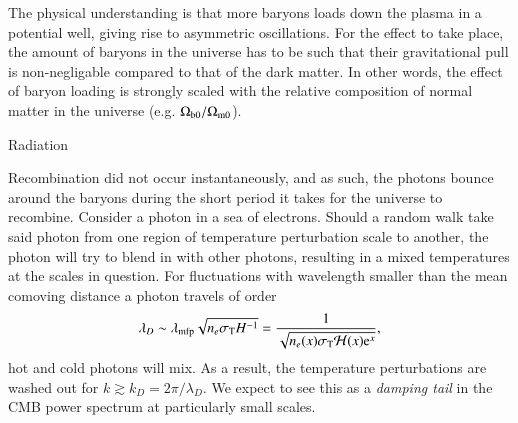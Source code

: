     The physical understanding is that more baryons loads down the plasma in a potential well, giving rise to asymmetric oscillations. For the effect to take place, the amount of baryons in the universe has to be such that their gravitational pull is non-negligable compared to that of the dark matter. In other words, the effect of baryon loading is strongly scaled with the relative composition of normal matter in the universe (e.g. $\Omega_\mathrm{b0}/\Omega_{\mathrm{m}0}$).
    
    Radiation 
    
    Recombination did not occur instantaneously, and as such, the photons bounce around the baryons during the short period it takes for the universe to recombine. Consider a photon in a sea of electrons. Should a random walk take said photon from one region of temperature perturbation scale to another, the photon will try to blend in with other photons, resulting in a mixed temperatures at the scales in question. For fluctuations with wavelength smaller than the mean comoving distance a photon travels of order
    \begin{equation}
        \lambda_D \sim \lambda\ped{mfp}\sqrt{n_e\sigma\ped{T}H^{-1}} = \frac{1}{\sqrt{n_e(x)\sigma\ped{T}\Hp(x) \eu[x]}},
    \end{equation}
    hot and cold photons will mix. As a result, the temperature perturbations are washed out for $k\gtrsim  k_D = 2\pi/\lambda_D$. We expect to see this as a \textit{damping tail} in the CMB power spectrum at particularly small scales.


    

    




